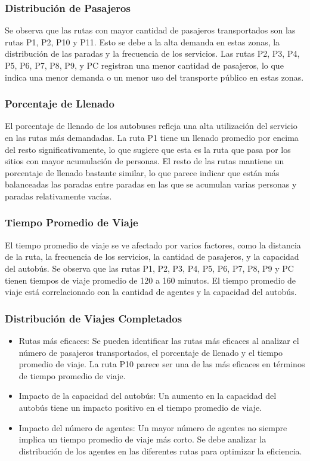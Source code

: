 \documentclass[a4paper,12pt]{article}
\begin{document}
\subsubsection{Distribución de Pasajeros}

Se observa que las rutas con mayor cantidad de pasajeros transportados son las rutas P1, P2, P10 y P11. Esto se debe a la alta demanda en estas zonas, la distribución de las paradas y la frecuencia de los servicios. Las rutas P2, P3, P4, P5, P6, P7, P8, P9, y PC registran una menor cantidad de pasajeros, lo que indica una menor demanda o un menor uso del transporte público en estas zonas.

\subsubsection{Porcentaje de Llenado}

El porcentaje de llenado de los autobuses refleja una alta utilización del servicio en las rutas más demandadas. La ruta P1 tiene un llenado promedio por encima del resto significativamente, lo que sugiere que esta es la ruta que pasa por los sitios con mayor acumulación de personas. El resto de las rutas mantiene un porcentaje de llenado bastante similar, lo que parece indicar que están más balanceadas las paradas entre paradas en las que se acumulan varias personas y paradas relativamente vacías.

\subsubsection{Tiempo Promedio de Viaje}

El tiempo promedio de viaje se ve afectado por varios factores, como la distancia de la ruta, la frecuencia de los servicios, la cantidad de pasajeros, y la capacidad del autobús. Se observa que las rutas P1, P2, P3, P4, P5, P6, P7, P8, P9 y PC tienen tiempos de viaje promedio de 120 a 160 minutos. El tiempo promedio de viaje está correlacionado con la cantidad de agentes y la capacidad del autobús.

\subsubsection{Distribución de Viajes Completados}

\begin{itemize}
\item Rutas más eficaces: Se pueden identificar las rutas más eficaces al analizar el número de pasajeros transportados, el porcentaje de llenado y el tiempo promedio de viaje. La ruta P10 parece ser una de las más eficaces en términos de tiempo promedio de viaje.
\item Impacto de la capacidad del autobús: Un aumento en la capacidad del autobús tiene un impacto positivo en el tiempo promedio de viaje.
\item Impacto del número de agentes: Un mayor número de agentes no siempre implica un tiempo promedio de viaje más corto. Se debe analizar la distribución de los agentes en las diferentes rutas para optimizar la eficiencia.
\end{itemize}
\end{document}
